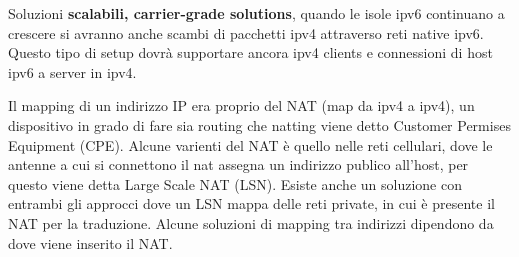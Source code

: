 \documentclass[12pt]{article}
\begin{document}
Soluzioni \textbf{scalabili, carrier-grade solutions}, quando le isole ipv6 continuano a crescere si avranno anche scambi di pacchetti ipv4 attraverso reti native ipv6. Questo tipo di setup dovr\`a supportare ancora ipv4 clients e connessioni di host ipv6 a server in ipv4.

Il mapping di un indirizzo IP era proprio del NAT (map da ipv4 a ipv4), un dispositivo in grado di fare sia routing che natting viene detto Customer Permises Equipment (CPE). Alcune varienti del NAT \`e quello nelle reti cellulari, dove le antenne a cui si connettono il nat assegna un indirizzo publico all'host, per questo viene detta Large Scale NAT (LSN). Esiste anche un soluzione con entrambi gli approcci dove un LSN mappa delle reti private, in cui \`e presente il NAT per la traduzione. Alcune soluzioni di mapping tra indirizzi dipendono da dove viene inserito il NAT.
\end{document}
